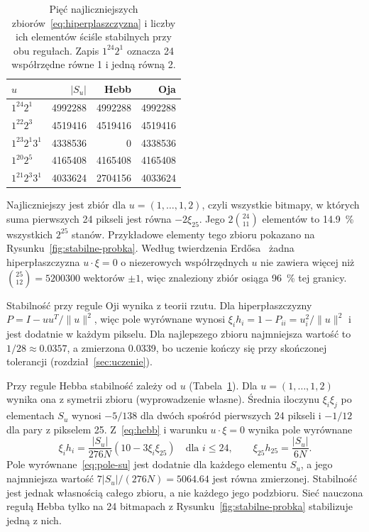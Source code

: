 \begin{table}[H]
    \centering
    \caption{Pięć najliczniejszych zbiorów~\eqref{eq:hiperplaszczyzna} i liczby ich elementów ściśle stabilnych przy obu regułach. Zapis $1^{24} 2^1$ oznacza 24 współrzędne równe 1 i jedną równą 2.}
    \label{tab:kandydaci}
    \begin{tabular}{lrrr}
        \toprule
        $u$ & $\lvert S_u \rvert$ & Hebb & Oja \\
        \midrule
        $1^{24} 2^1$ & \num{4992288} & \num{4992288} & \num{4992288} \\
        $1^{22} 2^3$ & \num{4519416} & \num{4519416} & \num{4519416} \\
        $1^{23} 2^1 3^1$ & \num{4338536} & 0 & \num{4338536} \\
        $1^{20} 2^5$ & \num{4165408} & \num{4165408} & \num{4165408} \\
        $1^{21} 2^3 3^1$ & \num{4033624} & \num{2704156} & \num{4033624} \\
        \bottomrule
    \end{tabular}
\end{table}

\noindent Najliczniejszy jest zbiór dla $u = (1, \ldots, 1, 2)$, czyli wszystkie bitmapy, w których suma pierwszych 24 pikseli jest równa $-2 \xi_{25}$. Jego $2 \binom{24}{11}$ elementów to \qty{14.9}{\percent} wszystkich $2^{25}$ stanów. Przykładowe elementy tego zbioru pokazano na Rysunku~\ref{fig:stabilne-probka}. Według twierdzenia Erdősa~\cite[s.~898]{erdos1945} żadna hiperpłaszczyzna $u \cdot \xi = 0$ o niezerowych współrzędnych $u$ nie zawiera więcej niż $\binom{25}{12} = \num{5200300}$ wektorów $\pm 1$, więc znaleziony zbiór osiąga \qty{96}{\percent} tej granicy.

Stabilność przy regule Oji wynika z teorii rzutu. Dla hiperpłaszczyzny $P = I - u u^T / \lVert u \rVert^2$, więc pole wyrównane wynosi $\xi_i h_i = 1 - P_{ii} = u_i^2 / \lVert u \rVert^2$ i jest dodatnie w każdym pikselu. Dla najlepszego zbioru najmniejsza wartość to $1/28 \approx \num{0.0357}$, a zmierzona \num{0.0339}, bo uczenie kończy się przy skończonej tolerancji (rozdział~\ref{sec:uczenie}).

Przy regule Hebba stabilność zależy od $u$ (Tabela~\ref{tab:kandydaci}). Dla $u = (1, \ldots, 1, 2)$ wynika ona z symetrii zbioru (wyprowadzenie własne). Średnia iloczynu $\xi_i \xi_j$ po elementach $S_u$ wynosi $-5/138$ dla dwóch spośród pierwszych 24 pikseli i $-1/12$ dla pary z pikselem 25. Z~\eqref{eq:hebb} i warunku $u \cdot \xi = 0$ wynika pole wyrównane
\begin{equation}
    \xi_i h_i = \frac{\lvert S_u \rvert}{276 N} \left(10 - 3 \xi_i \xi_{25}\right) \quad \text{dla } i \le 24, \qquad \xi_{25} h_{25} = \frac{\lvert S_u \rvert}{6 N}.
    \label{eq:pole-su}
\end{equation}
Pole wyrównane~\eqref{eq:pole-su} jest dodatnie dla każdego elementu $S_u$, a jego najmniejsza wartość $7 \lvert S_u \rvert / (276 N) = \num{5064.64}$ jest równa zmierzonej. Stabilność jest jednak własnością całego zbioru, a nie każdego jego podzbioru. Sieć nauczona regułą Hebba tylko na 24 bitmapach z Rysunku~\ref{fig:stabilne-probka} stabilizuje jedną z nich.

